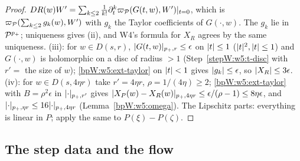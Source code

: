 \begin{proof}
$DR(w)W'=\sum_{k\le2}\frac1{k!}\partial_t^k\varpi_{\mathcal P}(G(t,w),W')|_{t=0}$, which is $\varpi_{\mathcal P}(\sum_{k\le2}g_k(w),W')$ with
$g_k$ the Taylor coefficients of $G(\cdot,w)$. The $g_k$ lie in $\mathcal P^{p_+}$; uniqueness gives (ii), and W4's formula
for $X_R$ agrees by the same uniqueness.
\label{stepW:w5:t-est} (iii): for $w\in D(s,r)$, $\lvert G(t,w)\rvert_{p_+,r}\le\epsilon$ on $\lvert t\rvert\le1$
($\lvert t\rvert^2,\lvert t\rvert\le1$) and $G(\cdot,w)$ is holomorphic on a disc of radius $>1$ (Step~\ref{stepW:w5:t-disc} with
$r'=$ the size of $w$); \ref{bpW:w5:ext-taylor} on $\lvert t\rvert<1$ gives $\lvert g_k\rvert\le\epsilon$, so $\lvert X_R\rvert\le3\epsilon$.
(iv): for $w\in D(s,4\eta r)$ take $r'=4\eta r$, $\rho=1/(4\eta)\ge2$; \ref{bpW:w5:ext-taylor} with $B=\rho^2\epsilon$ in
$\lvert \cdot\rvert_{p_+,r'}$ gives $\lvert X_P(w)-X_R(w)\rvert_{p_+,4\eta r}\le\epsilon/(\rho-1)\le8\eta\epsilon$, and
$\lvert \cdot\rvert_{p_+,\eta r}\le16\lvert \cdot\rvert_{p_+,4\eta r}$ (Lemma~\ref{bpW:w5:omega}). The Lipschitz parts: everything is linear
in $P$; apply the same to $P(\xi)-P(\zeta)$.
\end{proof}

\subsection{The step data and the flow}\label{bpW:w5:flow-sec}


